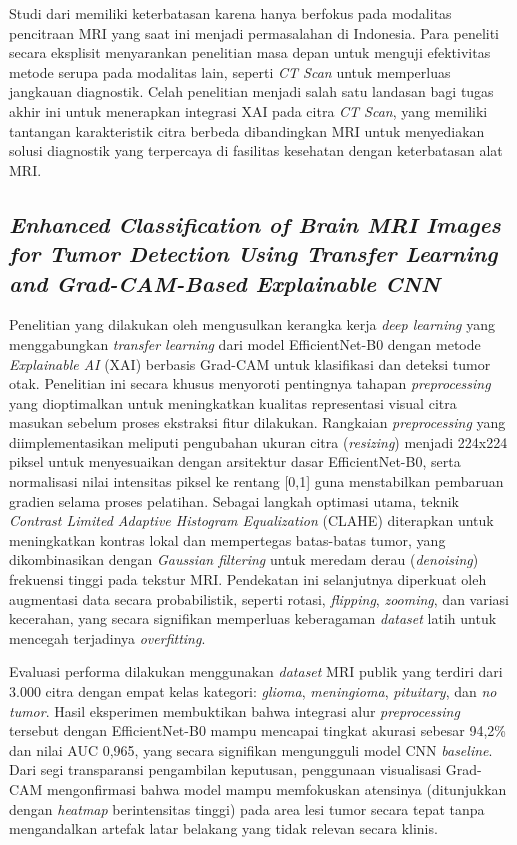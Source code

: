 Studi dari \textcite{Iftikhar2025ExplainableCNN} memiliki keterbatasan karena hanya berfokus pada modalitas pencitraan MRI yang saat ini menjadi permasalahan di Indonesia. Para peneliti secara eksplisit menyarankan penelitian masa depan untuk menguji efektivitas metode serupa pada modalitas lain, seperti \textit{CT Scan} untuk memperluas jangkauan diagnostik. Celah penelitian menjadi salah satu landasan bagi tugas akhir ini untuk menerapkan integrasi XAI pada citra \textit{CT Scan}, yang memiliki tantangan karakteristik citra berbeda dibandingkan MRI untuk menyediakan solusi diagnostik yang terpercaya di fasilitas kesehatan dengan keterbatasan alat MRI.

\subsection{\textit{Enhanced Classification of Brain MRI Images for Tumor Detection Using Transfer Learning and Grad-CAM-Based Explainable CNN}}

Penelitian yang dilakukan oleh \textcite{putra2025enhanced} mengusulkan kerangka kerja \textit{deep learning} yang menggabungkan \textit{transfer learning} dari model EfficientNet-B0 dengan metode \textit{Explainable AI} (XAI) berbasis Grad-CAM untuk klasifikasi dan deteksi tumor otak. Penelitian ini secara khusus menyoroti pentingnya tahapan \textit{preprocessing} yang dioptimalkan untuk meningkatkan kualitas representasi visual citra masukan sebelum proses ekstraksi fitur dilakukan. Rangkaian \textit{preprocessing} yang diimplementasikan meliputi pengubahan ukuran citra (\textit{resizing}) menjadi 224x224 piksel untuk menyesuaikan dengan arsitektur dasar EfficientNet-B0, serta normalisasi nilai intensitas piksel ke rentang [0,1] guna menstabilkan pembaruan gradien selama proses pelatihan. Sebagai langkah optimasi utama, teknik \textit{Contrast Limited Adaptive Histogram Equalization} (CLAHE) diterapkan untuk meningkatkan kontras lokal dan mempertegas batas-batas tumor, yang dikombinasikan dengan \textit{Gaussian filtering} untuk meredam derau (\textit{denoising}) frekuensi tinggi pada tekstur MRI. Pendekatan ini selanjutnya diperkuat oleh augmentasi data secara probabilistik, seperti rotasi, \textit{flipping}, \textit{zooming}, dan variasi kecerahan, yang secara signifikan memperluas keberagaman \textit{dataset} latih untuk mencegah terjadinya \textit{overfitting}.

Evaluasi performa dilakukan menggunakan \textit{dataset} MRI publik yang terdiri dari 3.000 citra dengan empat kelas kategori: \textit{glioma}, \textit{meningioma}, \textit{pituitary}, dan \textit{no tumor}. Hasil eksperimen membuktikan bahwa integrasi alur \textit{preprocessing} tersebut dengan EfficientNet-B0 mampu mencapai tingkat akurasi sebesar 94,2\% dan nilai AUC 0,965, yang secara signifikan mengungguli model CNN \textit{baseline}. Dari segi transparansi pengambilan keputusan, penggunaan visualisasi Grad-CAM mengonfirmasi bahwa model mampu memfokuskan atensinya (ditunjukkan dengan \textit{heatmap} berintensitas tinggi) pada area lesi tumor secara tepat tanpa mengandalkan artefak latar belakang yang tidak relevan secara klinis.

